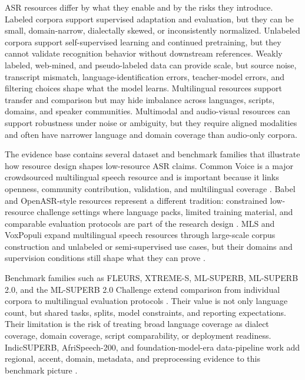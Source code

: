 \documentclass[pdflatex,sn-basic]{sn-jnl}
\theoremstyle{thmstyleone}
\theoremstyle{thmstyletwo}
\theoremstyle{thmstylethree}
\begin{document}
ASR resources differ by what they enable and by the risks they introduce. Labeled corpora support supervised adaptation and evaluation, but they can be small, domain-narrow, dialectally skewed, or inconsistently normalized. Unlabeled corpora support self-supervised learning and continued pretraining, but they cannot validate recognition behavior without downstream references. Weakly labeled, web-mined, and pseudo-labeled data can provide scale, but source noise, transcript mismatch, language-identification errors, teacher-model errors, and filtering choices shape what the model learns. Multilingual resources support transfer and comparison but may hide imbalance across languages, scripts, domains, and speaker communities. Multimodal and audio-visual resources can support robustness under noise or ambiguity, but they require aligned modalities and often have narrower language and domain coverage than audio-only corpora.

The evidence base contains several dataset and benchmark families that illustrate how resource design shapes low-resource ASR claims. Common Voice is a major crowdsourced multilingual speech resource and is important because it links openness, community contribution, validation, and multilingual coverage \citep{ardila2020commonvoice}. Babel and OpenASR-style resources represent a different tradition: constrained low-resource challenge settings where language packs, limited training material, and comparable evaluation protocols are part of the research design \citep{gales2014_babel_project_research_cued,peterson2022_openasr21}. MLS and VoxPopuli expand multilingual speech resources through large-scale corpus construction and unlabeled or semi-supervised use cases, but their domains and supervision conditions still shape what they can prove \citep{pratap20_interspeech,wang2021voxpopuli}.

Benchmark families such as FLEURS, XTREME-S, ML-SUPERB, ML-SUPERB 2.0, and the ML-SUPERB 2.0 Challenge extend comparison from individual corpora to multilingual evaluation protocols \citep{conneau2022fleurs,conneau2022xtreme_s,shi2023mlsuperb,shi2024mlsuperb2,chen2025mlsuperb2challenge}. Their value is not only language count, but shared tasks, splits, model constraints, and reporting expectations. Their limitation is the risk of treating broad language coverage as dialect coverage, domain coverage, script comparability, or deployment readiness. IndicSUPERB, AfriSpeech-200, and foundation-model-era data-pipeline work add regional, accent, domain, metadata, and preprocessing evidence to this benchmark picture \citep{javed2023indsuperb,olatunji2023_afrispeech200,tian24_interspeech}.
\end{document}
